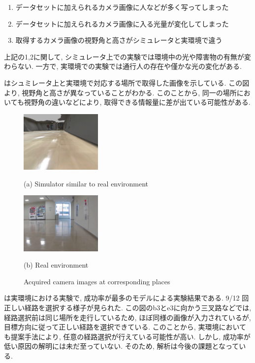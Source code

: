 \begin{enumerate}
  \item データセットに加えられるカメラ画像に人などが多く写ってしまった
  \item データセットに加えられるカメラ画像に入る光量が変化してしまった
  \item 取得するカメラ画像の視野角と高さがシミュレータと実環境で違う
\end{enumerate}

上記の1,2に関して, シミュレータ上での実験では環境中の光や障害物の有無が変わらない. 一方で, 実環境での実験では通行人の存在や僅かな光の変化がある. 
\par
{}はシュミレータ上と実環境で対応する場所で取得した画像を示している. この図より, 視野角と高さが異なっていることがわかる. このことから, 同一の場所においても視野角の違いなどにより, 取得できる情報量に差が出ている可能性がある.

\begin{figure}[h]
  \centering
  \begin{minipage}[b]{67mm}
    \centering
    \includegraphics[width=40mm]{images/horizonal_sim.png}
    \caption*{(a) Simulator similar to real environment}
  \end{minipage} 
  \begin{minipage}[b]{67mm}
    \centering
    \includegraphics[width=40mm]{images/horizonal_real.png}
    \caption*{(b) Real environment}
  \end{minipage}
  \caption{Acquired camera images at corresponding places}
  \label{Fig:horizonal}
\end{figure}

は実環境における実験で, 成功率が最多のモデルによる実験結果である. 9/12 回正しい経路を選択する様子が見られた. この図のb3とe3に向かう三叉路などでは, 経路選択前は同じ場所を走行しているため, ほぼ同様の画像が入力されているが, 目標方向に従って正しい経路を選択できている. このことから, 実環境においても提案手法により, 任意の経路選択が行えている可能性が高い.
しかし, 成功率が低い原因の解明には未だ至っていない. そのため, 解析は今後の課題となっている.

